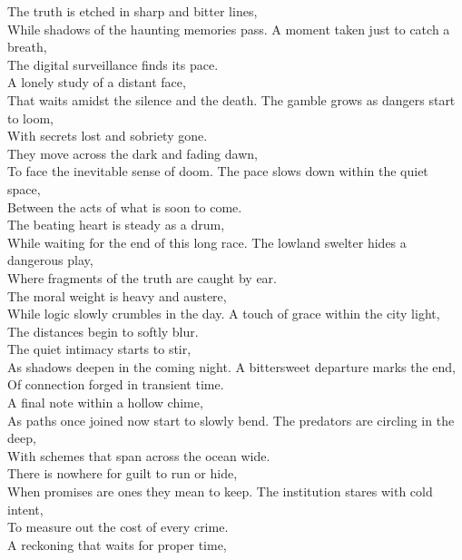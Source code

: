 \begin{lyrics}
The truth is etched in sharp and bitter lines,\\
While shadows of the haunting memories pass.
A moment taken just to catch a breath,\\
The digital surveillance finds its pace.\\
A lonely study of a distant face,\\
That waits amidst the silence and the death.
The gamble grows as dangers start to loom,\\
With secrets lost and sobriety gone.\\
They move across the dark and fading dawn,\\
To face the inevitable sense of doom.
The pace slows down within the quiet space,\\
Between the acts of what is soon to come.\\
The beating heart is steady as a drum,\\
While waiting for the end of this long race.
The lowland swelter hides a dangerous play,\\
Where fragments of the truth are caught by ear.\\
The moral weight is heavy and austere,\\
While logic slowly crumbles in the day.
A touch of grace within the city light,\\
The distances begin to softly blur.\\
The quiet intimacy starts to stir,\\
As shadows deepen in the coming night.
A bittersweet departure marks the end,\\
Of connection forged in transient time.\\
A final note within a hollow chime,\\
As paths once joined now start to slowly bend.
The predators are circling in the deep,\\
With schemes that span across the ocean wide.\\
There is nowhere for guilt to run or hide,\\
When promises are ones they mean to keep.
The institution stares with cold intent,\\
To measure out the cost of every crime.\\
A reckoning that waits for proper time,\\

\end{lyrics}

